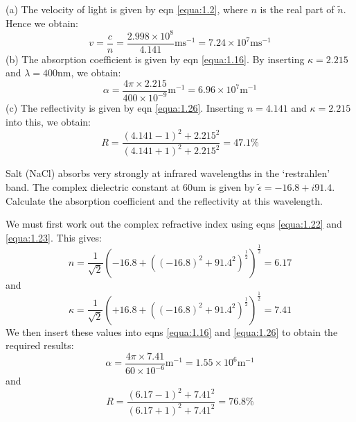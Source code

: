 \documentclass[12pt]{book}
\def\um{\mathrm{um}}
\begin{document}
\begin{Answer}
  (a) The velocity of light is given by eqn \ref{equa:1.2}, where $n$ is the real part of $\tilde{n}$. Hence we obtain:
  \begin{equation*}
    v=\frac{c}{n}=\frac{2.998\times10^8}{4.141}\mathrm{ms^{-1}}=7.24\times10^7\mathrm{ms^{-1}}
  \end{equation*}
  (b) The absorption coefficient is given by eqn \ref{equa:1.16}. By inserting $\kappa= 2.215$ and $\lambda=400$nm, we obtain:
  \begin{equation*}
    \alpha=\frac{4\pi\times2.215}{400\times10^{-9}}\mathrm{m^{-1}}=6.96\times10^7\mathrm{m^{-1}}
  \end{equation*}
  (c) The reflectivity is given by eqn \ref{equa:1.26}. Inserting $n = 4.141$ and $\kappa=2.215$ into this, we obtain:
  \begin{equation*}
    R=\frac{(4.141-1)^2+2.215^2}{(4.141+1)^2+2.215^2}=47.1 \%
  \end{equation*}
\end{Answer}

\begin{Exercise}
  Salt (NaCl) absorbs very strongly at infrared wavelengths in the `restrahlen' band. The complex dielectric constant at $60\um$ is given by $\tilde{\epsilon}=-16.8+i91.4$. Calculate the absorption coefficient and the reflectivity at this wavelength.
\end{Exercise}

\begin{Answer}
  We must first work out the complex refractive index using eqns \ref{equa:1.22} and \ref{equa:1.23}. This gives:
  \begin{equation*}
    n=\frac{1}{\sqrt{2}}(-16.8+((-16.8)^2+91.4^2)^{\frac{1}{2}})^{\frac{1}{2}}=6.17
  \end{equation*}
  and
  \begin{equation*}
    \kappa=\frac{1}{\sqrt{2}}(+16.8+((-16.8)^2+91.4^2)^{\frac{1}{2}})^{\frac{1}{2}}=7.41
  \end{equation*}
  We then insert these values into eqns \ref{equa:1.16} and \ref{equa:1.26} to obtain the required results:
  \begin{equation*}
    \alpha=\frac{4\pi\times7.41}{60\times10^{-6}}\mathrm{m^{-1}}=1.55\times10^6\mathrm{m^{-1}}
  \end{equation*}
  and
  \begin{equation*}
    R=\frac{(6.17-1)^2+7.41^2}{(6.17+1)^2+7.41^2}=76.8\%
  \end{equation*}
\end{Answer}
\end{document}
